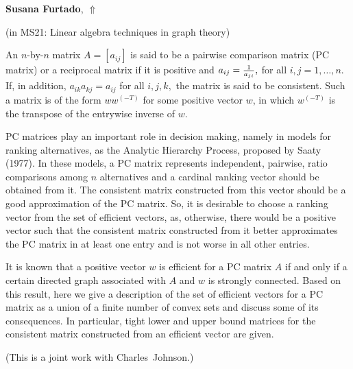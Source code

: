 \documentclass[ILAS2025-program.tex]{subfiles}
\begin{document}
\hypertarget{down0169}{}\begin{ilasabstract}
    
\textbf{Susana Furtado},  \hfill \hyperlink{up0169}{$\Uparrow$}
    
    
(in {\color{mstitle}MS21: Linear algebra techniques in graph theory})
        
\mtskip
    An $n$-by-$n$ matrix $A=[a_{ij}]$ is said to be a pairwise comparison matrix (PC matrix)
or a reciprocal matrix if it is positive and $a_{ij}=\frac{1}{%
a_{ji}},$ for all $i,j=1,\ldots ,n.$ If, in addition, $a_{ik}a_{kj}=a_{ij}$ for
all $i,j,k,$ the matrix is said to be consistent. Such a matrix is of the
form $ww^{(-T)}$ for some positive vector $w$, in which $w^{(-T)}$ is the transpose of the entrywise
inverse of $w$.

PC matrices play an important role in decision making, namely in models for ranking
alternatives, as the Analytic Hierarchy Process,  proposed by Saaty (1977). 
In these models, a PC matrix represents independent, pairwise, ratio
comparisons among $n$ alternatives and a cardinal ranking vector should be
obtained from it. The consistent matrix constructed from this vector should
be a good approximation of the PC matrix. So, it is desirable to choose a
ranking vector from the set of efficient vectors, as, otherwise, there would
be a positive vector such that the consistent matrix constructed from it
better approximates the PC matrix in at least one entry and is not worse in
all other entries. 

It is known that a positive vector $w$ is efficient for a PC matrix $A$ if
and only if a certain directed graph associated with $A$ and $w$ is strongly
connected. Based on this result, here we give a description of the set of
efficient vectors for a PC matrix as a union of a finite number of
convex sets and discuss some of its consequences. In particular, tight lower
and upper bound matrices for the consistent matrix constructed from an
efficient vector are given. 

(This is a joint work with Charles~Johnson.) 

\end{ilasabstract}
    
\end{document}
